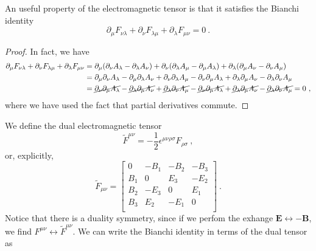     An useful property of the electromagnetic tensor is that it satisfies the Bianchi identity 
    \begin{equation*}
        \partial_\mu F_{\nu\lambda} + \partial_\nu F_{\lambda \mu} + \partial_\lambda F_{\mu \nu} = 0 ~.
    \end{equation*}
    \begin{proof}
        In fact, we have 
        \begin{equation*}
        \begin{aligned}
            \partial_\mu F_{\nu\lambda} + \partial_\nu F_{\lambda \mu} + \partial_\lambda F_{\mu \nu} & = \partial_\mu (\partial_\nu A_\lambda - \partial_\lambda A_\nu) + \partial_\nu (\partial_\lambda A_\mu - \partial_\mu A_\lambda) + \partial_\lambda (\partial_\mu A_\nu - \partial_\nu A_\mu) \\ & = \partial_\mu \partial_\nu A_\lambda -  \partial_\mu \partial_\lambda A_\nu + \partial_\nu \partial_\lambda A_\mu - \partial_\nu  \partial_\mu A_\lambda + \partial_\lambda \partial_\mu A_\nu - \partial_\lambda \partial_\nu A_\mu \\ & = \cancel{\partial_\nu \partial_\mu A_\lambda} - \cancel{\partial_\lambda \partial_\mu A_\nu} +  \cancel{\partial_\lambda \partial_\nu A_\mu} - \cancel{\partial_\nu \partial_\mu A_\lambda} + \cancel{\partial_\lambda \partial_\mu A_\nu} - \cancel{\partial_\lambda \partial_\nu A_\mu} = 0 ~,
        \end{aligned}
        \end{equation*}
        where we have used the fact that partial derivatives commute.
    \end{proof}
    We define the dual electromagnetic tensor
    \begin{equation*}
        \tilde F^{\mu\nu} = - \frac{1}{2} \epsilon^{\mu\nu\rho\sigma} F_{\rho\sigma} ~,
    \end{equation*}
    or, explicitly, 
    \begin{equation*}
        \tilde F_{\mu\nu} = \begin{bmatrix}
            0 & - B_1 & - B_2 & - B_3 \\ 
            B_1 & 0 & E_3 & -E_2 \\ 
            B_2 & -E_3 & 0 & E_1 \\ 
            B_3 & E_2 & -E_1 & 0 \\
        \end{bmatrix} ~.
    \end{equation*}
    Notice that there is a duality symmetry, since if we perfom the exhange $\mathbf E \leftrightarrow - \mathbf B$, we find $F^{\mu\nu} \leftrightarrow \tilde F^{\mu\nu}$. We can write the Bianchi identity in terms of the dual tensor as
